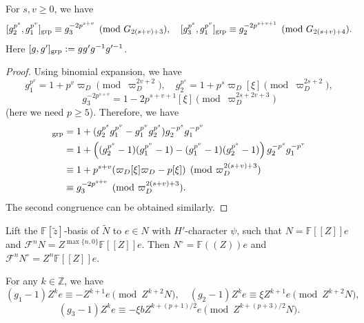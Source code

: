 \documentclass[11pt,a4paper]{article} %
\def\FF{\mathbb{F}}
\def\ZZ{\mathbb{Z}}
\def\cF{\mathcal{F}}
\def\max{\operatorname{max}}
\begin{document}
\begin{lemma}\label{lem:evaluation-1}
    For $s,v\ge0$, we have
    \[
    [g_2^{p^s},g_1^{p^v}]_{\rm grp}\equiv g_3^{-2p^{s+v}}\pmod{G_{2(s+v)+3}},\quad [g_3^{p^s},g_1^{p^v}]_{\rm grp}\equiv g_2^{-2p^{s+v+1}}\pmod{G_{2(s+v)+4}}.
    \]
    Here $[g,g']_{\rm grp}:=gg'g^{-1}g'^{-1}$.
\end{lemma}

\begin{proof}
    Using binomial expansion, we have
    \[
    g_1^{p^v}=1+p^v\varpi_D\pmod{\varpi_D^{2v+2}},\quad g_2^{p^s}=1+p^s\varpi_D[\xi]\pmod{\varpi_D^{2s+2}},
    \]
    \[
    g_3^{-2p^{s+v}}=1-2p^{s+v+1}[\xi]\pmod{\varpi_D^{2s+2v+3}}
    \]
    (here we need $p\ge5$). Therefore, we have
    \begin{align*}
            [g_2^{p^s},g_1^{p^v}]_{\rm grp}&=1+(g_2^{p^s}g_1^{p^v}-g_1^{p^v}g_2^{p^s})g_2^{-p^s}g_1^{-p^v}\\
            &=1+\left((g_2^{p^s}-1)(g_1^{p^v}-1)-(g_1^{p^v}-1)(g_2^{p^s}-1)\right)g_2^{-p^s}g_1^{-p^v}\\
            &\equiv1+p^{s+v}(\varpi_D[\xi]\varpi_D-p[\xi])\pmod{\varpi_D^{2(s+v)+3}}\\
            &\equiv g_3^{-2p^{s+v}}\pmod{\varpi_D^{2(s+v)+3}}.
    \end{align*}
    The second congruence can be obtained similarly.
\end{proof}

Lift the $\FF[\widetilde{z}]$-basis of $\widetilde{N}$ to $e\in N$ with $H'$-character $\psi$, such that $N=\FF[[Z]]e$ and $\cF^n N=Z^{\max\{n,0\}}\FF[[Z]]e$. Then $N^\circ=\FF((Z))e$ and $\cF^n N^\circ=Z^n\FF[[Z]]e$.

\begin{lemma}\label{lem:evaluation-2}
    For any $k\in\ZZ$, we have
    \[
    (g_1-1)Z^ke\equiv-Z^{k+1}e\pmod{Z^{k+2}N},\quad
    (g_2-1)Z^ke\equiv\xi Z^{k+1}e\pmod{Z^{k+2}N},
    \]
    \[
    (g_3-1)Z^ke\equiv-\xi bZ^{k+(p+1)/2}e\pmod{Z^{k+(p+3)/2}N}.
    \]
\end{lemma}
\end{document}
